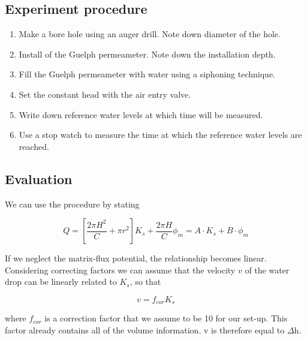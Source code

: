 \documentclass[
10pt, %
a4paper, %
oneside, %
headinclude,footinclude, %
BCOR5mm, %
]{scrartcl}
\begin{document}
 \subsection{Experiment procedure}
 \begin{enumerate}
 	\item Make a bore hole using an auger drill. Note down diameter of the hole.
 	\item Install of the Guelph permeameter. Note down the installation depth.
 	\item Fill the Guelph permeameter with water using a siphoning technique. 
 	\item Set the constant head with the air entry valve.
 	\item Write down reference water levels at which time will be measured.
 	\item Use a stop watch to measure the time at which the reference water levels are reached.
 \end{enumerate}
 
 \subsection{Evaluation}
 
 We can use the procedure by \cite{elrick1992methods} stating
 
 \begin{equation}
 Q= [\frac{2 \pi H^2}{C}+\pi r^2]K_s+\frac{2 \pi H}{C}\phi_m = A \cdot K_s +B \cdot \phi_m
 \end{equation}

If we neglect the matrix-flux potential, the relationship becomes linear. Considering correcting factors we can assume that the velocity $v$ of the water drop can be linearly related to $K_s$, so that

 
 \begin{equation}
 v= f_{cor} K_s
\end{equation}

where $f_{cor}$ is a correction factor that we assume to be 10 for our set-up. This factor already contains all of the volume information. v is therefore equal to $\Delta$h.





\end{document}
